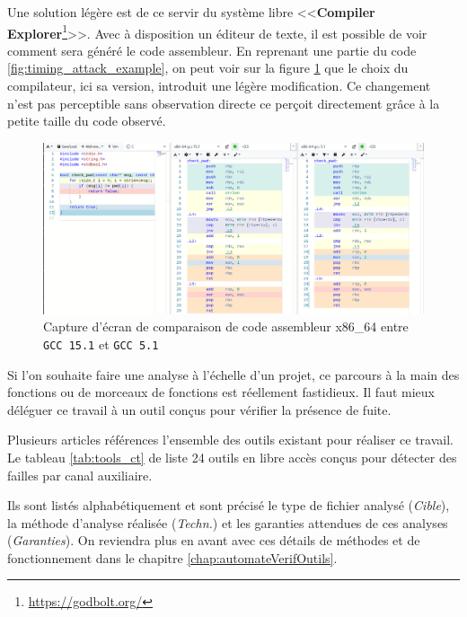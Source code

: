Une solution légère est de ce servir du système libre <<\textbf{Compiler Explorer}\footnote{\url{https://godbolt.org/}}>>. Avec à disposition un éditeur de texte, il est possible de voir comment sera généré le code assembleur. En reprenant une partie du code \ref{fig:timing_attack_example}, on peut voir sur la figure \ref{img:godbolt_example} que le choix du compilateur, ici sa version, introduit une légère modification. Ce changement n'est pas perceptible sans observation directe ce perçoit directement grâce à la petite taille du code observé.

\begin{figure}[!h]
  \begin{adjustwidth}{-2.5cm}{-2cm}
    \centering
    \includegraphics[trim = 1mm 0mm 0mm 0mm, clip,width=0.9\paperwidth]{pictures/godbolt_example.png}
    \caption{Capture d'écran de comparaison de code assembleur x86\_64 entre \texttt{GCC 15.1} et \texttt{GCC 5.1}}
    \label{img:godbolt_example}
  \end{adjustwidth}
\end{figure}

Si l'on souhaite faire une analyse à l'échelle d'un projet, ce parcours à la main des fonctions ou de morceaux de fonctions est réellement fastidieux. Il faut mieux déléguer ce travail à un outil conçus pour vérifier la présence de fuite.\smallbreak

Plusieurs articles références l'ensemble des outils existant \cite{notThatHardCT, GeimerEvaluationsSideChannel} pour réaliser ce travail. Le tableau \ref{tab:tools_ct} de \citeauthor{notThatHardCT} liste 24 outils en libre accès conçus pour détecter des failles par canal auxiliaire.

Ils sont listés alphabétiquement et sont précisé le type de fichier analysé (\textit{Cible}), la méthode d'analyse réalisée (\textit{Techn.}) et les garanties attendues de ces analyses (\textit{Garanties}). On reviendra plus en avant avec ces détails de méthodes et de fonctionnement dans le chapitre \ref{chap:automateVerifOutils}.\medbreak

